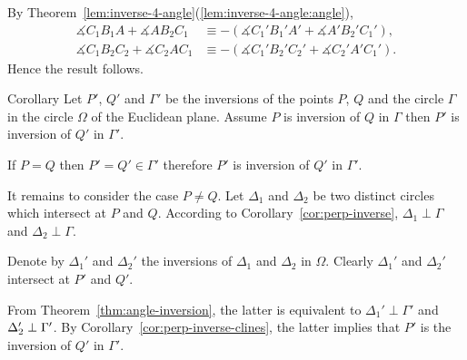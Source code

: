 By Theorem~\ref{lem:inverse-4-angle}(\ref{lem:inverse-4-angle:angle}),
\begin{align*}
\measuredangle C_1B_1A+\measuredangle AB_2 C_1&\equiv-(\measuredangle C_1'B_1'A'+\measuredangle A'B_2' C_1'),
\\
\measuredangle C_1B_2C_2 +\measuredangle C_2 A C_1&\equiv-(\measuredangle C_1'B_2'C_2' +\measuredangle C_2' A' C_1').
\end{align*}
Hence the result follows.\qeds




\begin{thm}{Corollary}\label{cor:invese-comp}
Let $P'$, $Q'$ and $\Gamma'$ 
be the inversions of the points $P$, $Q$ and the circle $\Gamma$ in the circle $\Omega$ of the Euclidean plane.
Assume $P$ is inversion of $Q$ in $\Gamma$ then 
$P'$ is inversion of $Q'$ in $\Gamma'$.
\end{thm}

If $P=Q$ then $P'=Q'\in\Gamma'$ therefore $P'$ is inversion of $Q'$ in $\Gamma'$.

It remains to consider the case $P\ne Q$. 
Let $\Delta_1$ and $\Delta_2$ be two distinct circles which intersect at $P$ and $Q$.
According to Corollary~\ref{cor:perp-inverse}, 
$\Delta_1\perp\Gamma$ and $\Delta_2\perp\Gamma$.

Denote by $\Delta_1'$ and $\Delta_2'$ the inversions of $\Delta_1$ and $\Delta_2$ in $\Omega$.
Clearly $\Delta_1'$ and $\Delta_2'$ intersect at $P'$ and $Q'$.

From Theorem~\ref{thm:angle-inversion}, 
the latter is equivalent 
to $\Delta_1'\perp\Gamma'$ and $\Delta_2'\z\perp\Gamma'$.
By Corollary~\ref{cor:perp-inverse-clines},
the latter implies that $P'$ is the inversion of $Q'$ in $\Gamma'$.
\qeds

